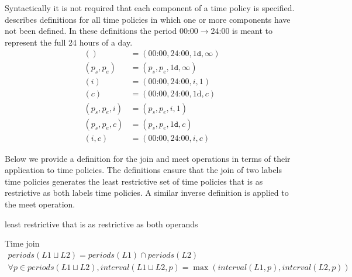 Syntactically it is not required that each component of a time policy is specified.
 describes definitions for all time policies in which one or more components have not been defined.
In these definitions the period 00:00$\rightarrow$24:00 is meant to represent the full 24 hours of a day.
\begin{align}
  () &= (\text{00:00}, \text{24:00}, 1\texttt{d}, \infty) \nonumber \\
  (p_s, p_e) &= (p_s, p_e, 1\texttt{d}, \infty) \nonumber \\
  (i) &= (\text{00:00}, \text{24:00}, i, 1) \nonumber \\
  (c) &= (\text{00:00}, \text{24:00}, 1\text{d}, c) \label{time:implicit} \\
  (p_s, p_e, i) &= (p_s, p_e, i, 1) \nonumber \\
  (p_s, p_e, c) &= (p_s, p_e, 1\texttt{d}, c) \nonumber \\
  (i, c) &= (\text{00:00}, \text{24:00}, i, c) \nonumber
\end{align}

Below we provide a definition for the join and meet operations in terms of their application to time policies.
The definitions ensure that the join of two labels time policies generates the least restrictive set of time policies that is as restrictive as both labels time policies.
A similar inverse definition is applied to the meet operation.

least restrictive that is as restrictive as both operands

\begin{definition}{Time join}
  \begin{align*}
    periods(L1 \sqcup L2) = periods(L1) \cap periods(L2)\\
    \forall p \in periods(L1 \sqcup L2), interval(L1 \sqcup L2, p) = \max(interval(L1, p), interval(L2, p))
  \end{align*}
\end{definition}
